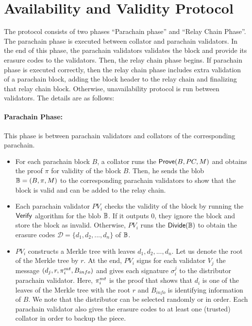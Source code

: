 \section{Availability and Validity Protocol}
\label{sec:protocol}

The protocol consists of two phases ``Parachain phase'' and ``Relay Chain Phase''. The parachain phase is executed between collator and parachain validators. In the end of this phase, the parachain validators validates the block and provide its erasure codes to the validators. Then, the relay chain phase begins. If parachain phase is executed correctly, then the relay chain phase includes extra validation of a parachain block, adding the block header to the relay chain and finalizing that relay chain block. Otherwise, unavailability protocol is run between validators. The details are as follows: 

\paragraph{Parachain Phase:} This phase is between parachain validators and collators of the corresponding parachain.

\begin{itemize}
    \item For each parachain block $B$, a collator runs the $\mathsf{Prove}(B,PC,M)$ and obtains the proof $\pi$ for validity of the block $B$. Then, he sends the blob $\mathbb{B} = (B,\pi,M)$ to the corresponding parachain validators to show that the block is valid and can be added to the relay chain. 
    
    \item Each parachain validator $PV_i$ checks the validity of the block by running the $\mathsf{Verify}$ algorithm for the blob $\mathbb{B}$. If it outputs 0, they ignore the block and store the block as invalid. Otherwise, $PV_i$ runs the $\mathsf{Divide}(\mathbb{B})$ to obtain the erasure codes $\mathcal{D} = \{d_1,d_2,...,d_n\}$ of $\mathbb{B}$.
    
    \item $PV_i$ constructs a Merkle tree  with  leaves $d_1,d_2,...,d_n$. Let us denote the root of the Merkle tree by $r$. At the end, $PV_i$ signs for each validator $V_j$ the message $(d_j, r, \pi^{mt}_i, B_{info})$ and gives each signature $\sigma_i^j$ to the distributor parachain validator. Here, $\pi^{mt}_i$ is the proof that shows that $d_i$ is one of the leaves of the Merkle tree with the root $r$ and $B_{info}$ is identifying information of $B$. We note that the distributor can be selected randomly or in order. Each parachain validator also gives the erasure codes to at least one (trusted) collator in order to backup the piece.
\end{itemize}


